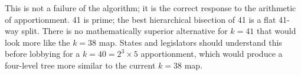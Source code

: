 This is not a failure of the algorithm; it is the correct response to the
arithmetic of apportionment.
41 is prime; the best hierarchical bisection of 41 is a flat 41-way split.
There is no mathematically superior alternative for $k = 41$ that would
look more like the $k = 38$ map.
States and legislators should understand this before lobbying for a
$k = 40 = 2^3 \times 5$ apportionment, which would produce a four-level
tree more similar to the current $k = 38$ map.
